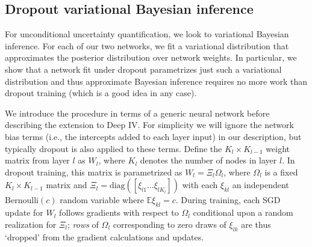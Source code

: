 \documentclass[12pt]{article}
\newcommand{\mr}[1]{\mathrm{#1}}
\newcommand{\ds}[1]{\mathds{#1}}
\begin{document}
\subsection{Dropout variational Bayesian inference}

For unconditional uncertainty quantification, we look to
variational Bayesian inference.   For each of our two networks, we  fit a
variational distribution that approximates the posterior distribution over
network weights. In particular, we show that a network fit under dropout
\citep{srivastava2014dropout} parametrizes just such a variational
distribution and thus approximate Bayesian inference requires no more work
than dropout training (which is a good idea in any case).

We  introduce the procedure in terms of a generic neural network before describing the extension to Deep IV.   For simplicity we will ignore the network bias terms (i.e., the intercepts added to each layer input) in our description, but typically dropout is also applied to these terms. Define the $K_l \times K_{l-1}$ weight matrix from layer $l$ as $W_l$, where $K_{l}$ denotes the number of nodes in layer $l$.  In dropout training, this matrix is parametrized as $W_l = \Xi_l\Omega_l $, where $\Omega_l$ is a fixed $K_l \times K_{l-1}$  matrix and  $\Xi_l = \mr{diag}\left([\xi_{l1} \ldots \xi_{lK_{l}}]\right)$  with each $\xi_{kl}$ an independent  $\mr{Bernoulli}(c)$ random variable where $\ds{E}\xi_{kl} = c$.  During training, each SGD update for $W_l$ follows gradients with respect to $\Omega_l$ conditional upon a random realization for $\Xi_l$; {\it rows} of $\Omega_l$ corresponding to zero draws of $\xi_{lk}$ are thus `dropped' from the gradient calculations and updates.
\end{document}

